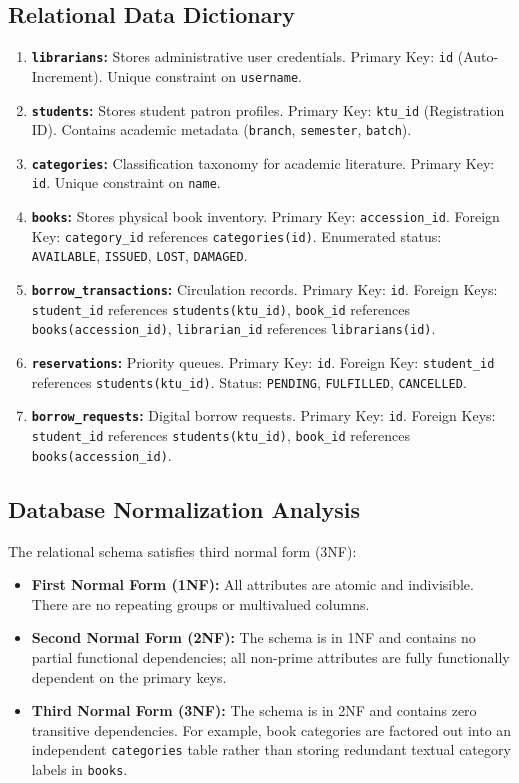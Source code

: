 \subsection{Relational Data Dictionary}
\begin{enumerate}
    \item \textbf{\texttt{librarians}:} Stores administrative user credentials. Primary Key: \texttt{id} (Auto-Increment). Unique constraint on \texttt{username}.
    \item \textbf{\texttt{students}:} Stores student patron profiles. Primary Key: \texttt{ktu\_id} (Registration ID). Contains academic metadata (\texttt{branch}, \texttt{semester}, \texttt{batch}).
    \item \textbf{\texttt{categories}:} Classification taxonomy for academic literature. Primary Key: \texttt{id}. Unique constraint on \texttt{name}.
    \item \textbf{\texttt{books}:} Stores physical book inventory. Primary Key: \texttt{accession\_id}. Foreign Key: \texttt{category\_id} references \texttt{categories(id)}. Enumerated status: \texttt{AVAILABLE}, \texttt{ISSUED}, \texttt{LOST}, \texttt{DAMAGED}.
    \item \textbf{\texttt{borrow\_transactions}:} Circulation records. Primary Key: \texttt{id}. Foreign Keys: \texttt{student\_id} references \texttt{students(ktu\_id)}, \texttt{book\_id} references \texttt{books(accession\_id)}, \texttt{librarian\_id} references \texttt{librarians(id)}.
    \item \textbf{\texttt{reservations}:} Priority queues. Primary Key: \texttt{id}. Foreign Key: \texttt{student\_id} references \texttt{students(ktu\_id)}. Status: \texttt{PENDING}, \texttt{FULFILLED}, \texttt{CANCELLED}.
    \item \textbf{\texttt{borrow\_requests}:} Digital borrow requests. Primary Key: \texttt{id}. Foreign Keys: \texttt{student\_id} references \texttt{students(ktu\_id)}, \texttt{book\_id} references \texttt{books(accession\_id)}.
\end{enumerate}

\subsection{Database Normalization Analysis}
The relational schema satisfies third normal form (3NF):
\begin{itemize}
    \item \textbf{First Normal Form (1NF):} All attributes are atomic and indivisible. There are no repeating groups or multivalued columns.
    \item \textbf{Second Normal Form (2NF):} The schema is in 1NF and contains no partial functional dependencies; all non-prime attributes are fully functionally dependent on the primary keys.
    \item \textbf{Third Normal Form (3NF):} The schema is in 2NF and contains zero transitive dependencies. For example, book categories are factored out into an independent \texttt{categories} table rather than storing redundant textual category labels in \texttt{books}.
\end{itemize}

